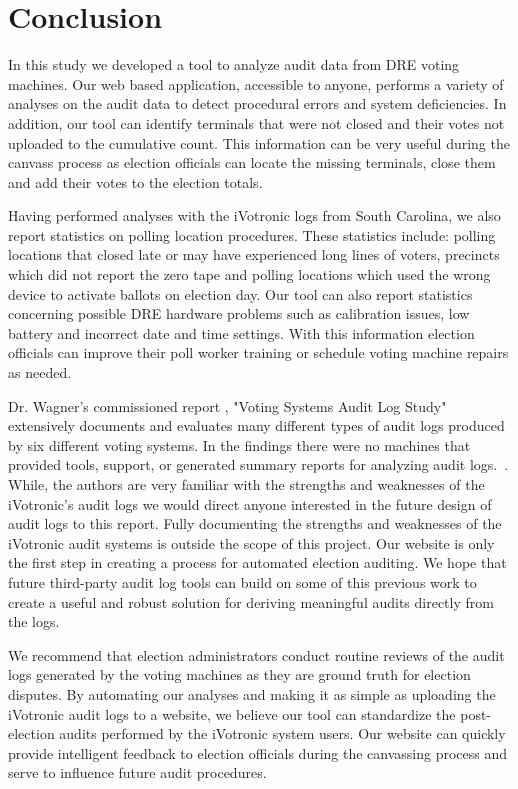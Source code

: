 \section{Conclusion}
In this study we developed a tool to analyze audit data from DRE voting machines. Our web based application, accessible to anyone, performs a variety of analyses on the audit data to detect procedural errors and system deficiencies. In addition, our tool can identify terminals that were not closed and their votes not uploaded to the cumulative count. This information can be very useful during the canvass process as election officials can locate the missing terminals, close them and add their votes to the election totals. 

Having performed analyses with the iVotronic logs from South Carolina, we also report statistics on polling location procedures. These statistics include: polling locations that closed late or may have experienced long lines of voters, precincts which did not report the zero tape and polling locations which used the wrong device to activate ballots on election day. Our tool can also report statistics concerning possible DRE hardware problems such as calibration issues, low battery and incorrect date and time settings. With this information election officials can improve their poll worker training or schedule voting machine repairs as needed.

Dr. Wagner's commissioned report ,  "Voting Systems Audit Log Study" extensively documents and evaluates many different types of audit logs produced by six different voting systems.  In the findings there were no machines that provided tools, support, or generated summary reports for analyzing audit logs.~\cite{Wagner2010}. While, the authors are very familiar with the strengths and weaknesses of the iVotronic's audit logs we would direct anyone interested in the future design of audit logs to this report.  Fully documenting the strengths and weaknesses of the iVotronic audit systems is outside the scope of this project. Our website is only the first step in creating a process for automated election auditing.  We hope that future third-party audit log  tools can build on some of this previous work to create a useful and robust solution for deriving meaningful audits directly from the logs.

We recommend that election administrators conduct routine reviews of the audit logs generated by the voting machines as they are ground truth for election disputes. By automating our analyses and making it as simple as uploading the iVotronic audit logs to a website, we believe our tool can standardize the post-election audits performed by the iVotronic system users. Our website can quickly provide intelligent feedback to election officials during the canvassing process and serve to influence future audit procedures. 

